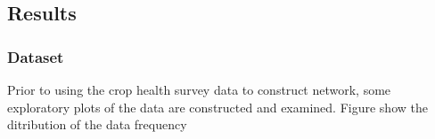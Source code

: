 \subsection{Results}

\subsubsection{Dataset}

Prior to using the crop health survey data to construct network, some exploratory plots of the data are constructed and examined. Figure show the ditribution of the data frequency 
